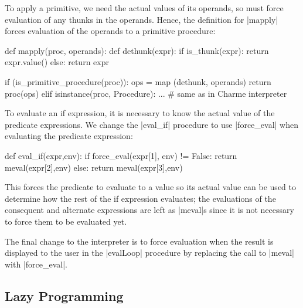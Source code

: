 To apply a primitive, we need the actual values of its operands, so must force evaluation of any thunks in the operands.  Hence, the definition for \pycode|mapply| forces evaluation of the operands to a primitive procedure:

\begin{pythoncode}
def mapply(proc, operands):    
    def dethunk(expr):
        if is_thunk(expr): return expr.value()
        else: return expr

    if (is_primitive_procedure(proc)):
        ops = map (dethunk, operands)
        return proc(ops)
    elif isinstance(proc, Procedure):
        ... # same as in Charme interpreter
\end{pythoncode}

To evaluate an if expression, it is necessary to know the actual value of the predicate expressions.  We change the \pycode|eval_if| procedure to use \pycode|force_eval| when evaluating the predicate expression:
\begin{pythoncode}[moreemph={[4]force_eval}]
def eval_if(expr,env):
    if force_eval(expr[1], env) != False: return meval(expr[2],env)
    else: return meval(expr[3],env)
\end{pythoncode}
This forces the predicate to evaluate to a value so its actual value can be used to determine how the rest of the if expression evaluates; the evaluations of the consequent and alternate expressions are left as \pycode|meval|s since it is not necessary to force them to be evaluated yet.

The final change to the interpreter is to force evaluation when the result is displayed to the user in the \pycode|evalLoop| procedure by replacing the call to \pycode|meval| with \pycode|force_eval|.

\subsection{Lazy Programming}\label{sec:lazyprogramming}

